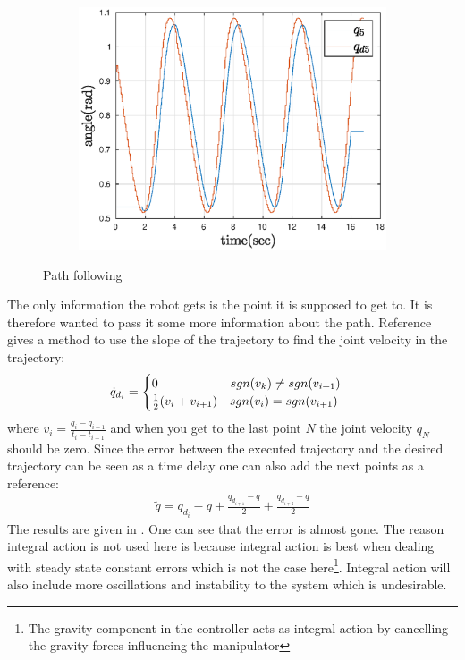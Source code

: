 \begin{figure}[htbp]
\begin{subfigure}[htbp]{0.45\textwidth}
        \includegraphics[width = \picsSiz\linewidth]{img/pathF5.eps}
        \caption{}
    \end{subfigure}
    \caption{Path following}
    \label{fig:pathTS}
\end{figure}
The only information the robot gets is the point it is supposed to get to. It is therefore wanted to pass it some more information about the path. Reference \cite{Siciliano} gives a method to use the slope of the trajectory to find the joint velocity in the trajectory:
\begin{align*}
    \dot{q}_{d_i} = 
    \begin{cases}
    0\hphantom{ \frac{1}{2}(v_i+v_{i+1})}\;\;sgn(v_k)\ne sgn(v_{i+1})\\
    \frac{1}{2}(v_i+v_{i+1}) \quad  sgn(v_i)= sgn(v_{i+1})
    \end{cases}
\end{align*}
where $v_i = \frac{q_i-q_{i-1}}{t_i-t_{i-1}}$ and when you get to the last point $N$ the joint velocity $q_N$ should be zero. Since the error between the executed trajectory and the desired trajectory can be seen as a time delay one can also add the next points as a reference:
\begin{align*}
    \tilde{q} = q_{d_i}-q + \frac{q_{d_{i+1}}-q }{2}+\frac{q_{d_{i+2}}-q }{2}
\end{align*}
The results are given in . One can see that the error is almost gone. The reason integral action is not used here is because integral action is best when dealing with steady state constant errors which is not the case here\footnote{The gravity component in the controller acts as integral action by cancelling the gravity forces influencing the manipulator}. Integral action will also include more oscillations and instability to the system which is undesirable.



